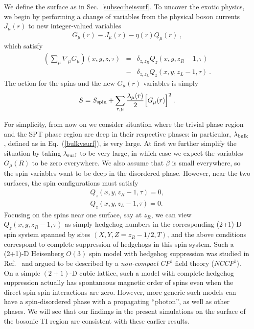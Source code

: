\documentclass[prb,twocolumn]{revtex4-1}
\begin{document}
We define the surface as in Sec.~\ref{subsec:heissurf}. To uncover the exotic physics, we begin by performing a change of variables from the physical boson currents $J_\mu(r)$ to new integer-valued variables
\begin{equation}
G_\mu(r) \equiv J_\mu(r) - \eta(r) Q_\mu(r) ~,
\end{equation}
which satisfy 
\begin{eqnarray*}
\left(\sum_\mu \nabla_\mu G_\mu\right) (x, y, z, \tau) &=& 
\delta_{z, z_R} Q_z(x, y, z_R-1, \tau) \\
&-& \delta_{z, z_L} Q_z(x, y, z_L-1, \tau) ~. 
\end{eqnarray*}
The action for the spins and the new $G_\mu(r)$ variables is simply
\begin{equation}
S = S_{\rm spin} + \sum_{r,\mu} \frac{\lambda_\mu(r)}{2} \Big[G_\mu(r)\Big]^2 ~.
\end{equation}

For simplicity, from now on we consider situation where the trivial phase region and the SPT phase region are deep in their respective phases: in particular, $\lambda_{\rm bulk}$, defined as in Eq.~(\ref{bulkvsurf}), is very large.  At first we further simplify the situation by taking $\lambda_{\rm surf}$ to be very large, in which case we expect the variables $G_\mu(R)$ to be zero everywhere.  We also assume that $\beta$ is small everywhere, so the spin variables want to be deep in the disordered phase.  However, near the two surfaces, the spin configurations must satisfy
\begin{equation}
\begin{array}{c}
Q_z(x, y, z_R-1, \tau) = 0, \\
Q_z(x, y, z_L-1, \tau) = 0.
\end{array}
\end{equation}
Focusing on the spins near one surface, say at $z_R$, we can view $Q_z(x, y, z_R-1, \tau)$ as simply hedgehog numbers in the corresponding (2+1)-D spin system spanned by sites $(X, Y, Z=z_R-1/2, T)$, and the above conditions correspond to complete suppression of hedgehogs in this spin system.  Such a (2+1)-D Heisenberg $O(3)$ spin model with hedgehog suppression was studied in Ref.~ and argued to be described by a \emph{non-compact} $CP^1$ field theory ($NCCP^1$).  On a simple $(2+1)$-D cubic lattice, such a model with complete hedgehog suppression actually has spontaneous magnetic order of spins even when the direct spin-spin interactions are zero.\cite{LauDasgupta, KamalMurthy}  However, more generic such models can have a spin-disordered phase with a propagating ``photon''\cite{KamalMurthy, LesikAshvin}, as well as other phases\cite{LesikAshvin2}.  We will see that our findings in the present simulations on the surface of the bosonic TI region are consistent with these earlier results.
\end{document}
